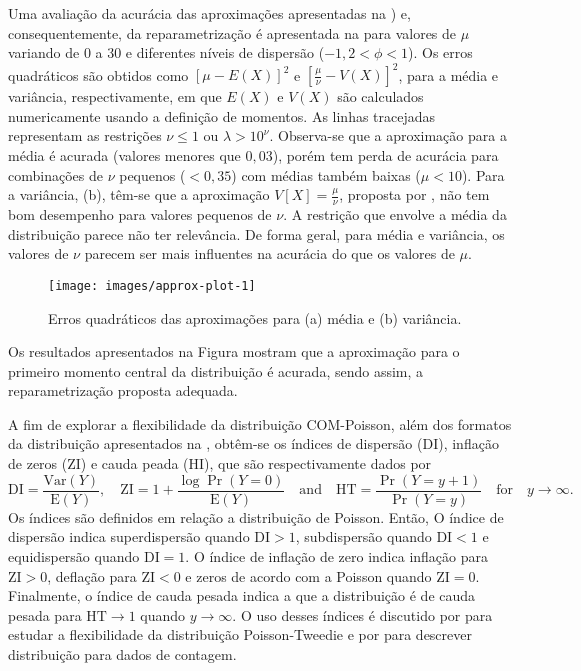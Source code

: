 \documentclass[
    oldfontcommands,
    11pt,
    openright,
    twoside,
    a4paper,
    english,
    brazil
]{abntex2}\usepackage[]{graphicx}\usepackage[]{color}
\begin{document}
Uma avaliação da acurácia das aproximações apresentadas na
) e, consequentemente, da reparametrização é
apresentada na  para valores de $\mu$ variando de
0 a 30 e diferentes níveis de dispersão ($-1,2 < \phi < 1$).  Os erros
quadráticos são obtidos como $[\mu - E(X)]^2$ e
$[\frac{\mu}{\nu} - V(X)]^2$, para a média e variância, respectivamente,
em que $E(X)$ e $V(X)$ são calculados numericamente usando a definição
de momentos.  As linhas tracejadas representam as restrições
$\nu \leq 1$ ou $\lambda > 10^\nu$.  Observa-se que a aproximação para a
média é acurada (valores menores que $0,03$), porém tem perda de
acurácia para combinações de $\nu$ pequenos ($<0,35$) com médias também
baixas ($\mu < 10$). Para a variância, (b), têm-se
que a aproximação $V[X] = \frac{\mu}{\nu}$, proposta por
\citet{Sellers2010}, não tem bom desempenho para valores pequenos
de $\nu$. A restrição que envolve a média da distribuição parece não ter
relevância. De forma geral, para média e variância, os valores de $\nu$
parecem ser mais influentes na acurácia do que os valores de $\mu$.

\begin{figure}[!htb]

{\centering \texttt{[image: images/approx-plot-1]} 

}

\caption[Erros quadráticos das aproximações para (a) média e (b) variância]{Erros quadráticos das aproximações para (a) média e (b) variância.}\label{fig:approx-plot}
\end{figure}



Os resultados apresentados na Figura  mostram que
a aproximação para o primeiro momento central da distribuição é acurada,
sendo assim, a reparametrização proposta adequada.

A fim de explorar a flexibilidade da distribuição COM-Poisson, além dos
formatos da distribuição apresentados na , obtêm-se os
índices de dispersão (DI), inflação de zeros (ZI) e cauda peada (HI),
que são respectivamente dados por
\begin{equation*}
\text{DI} = \frac{\text{Var}(Y)}{\text{E}(Y)}, \quad
\text{ZI} = 1 + \frac{\log \Pr(Y = 0)}{\text{E}(Y)}
  \quad \text{and} \quad
\text{HT} = \frac{\Pr(Y=y+1)}{\Pr(Y=y)}\quad \text{for} \quad y \to
\infty.
\end{equation*}
Os índices são definidos em relação a distribuição de Poisson. Então, O
índice de dispersão indica superdispersão quando $\text{DI} > 1$,
subdispersão quando $\text{DI} < 1$ e equidispersão quando
$\text{DI} = 1$. O índice de inflação de zero indica inflação para
$\text{ZI} > 0$, deflação para $\text{ZI} < 0$ e zeros de acordo com a
Poisson quando $\text{ZI} = 0$. Finalmente, o índice de cauda pesada
indica a que a distribuição é de cauda pesada para $\text{HT} \to 1$
quando $y \to \infty$.  O uso desses índices é discutido por
\citet{Bonat2017} para estudar a flexibilidade da distribuição
Poisson-Tweedie e por \citet{Puig2006} para descrever distribuição para
dados de contagem.
\end{document}
